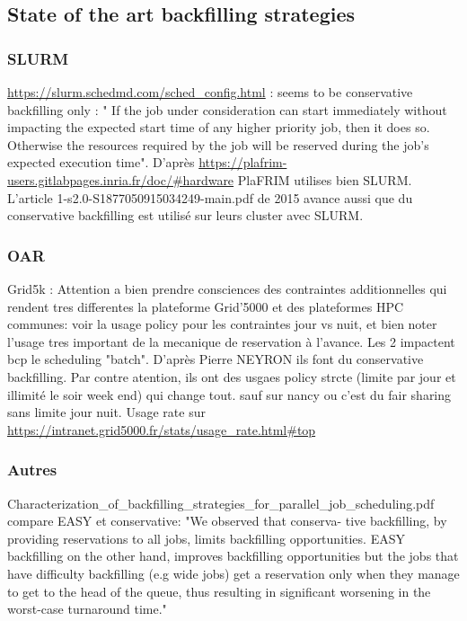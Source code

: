 \documentclass[a4paper]{article}
\begin{document}
\subsection{State of the art backfilling strategies}

\subsubsection{SLURM}

\url{https://slurm.schedmd.com/sched_config.html} : seems to be conservative backfilling only : " If the job under consideration can start immediately without impacting the expected start time of any higher priority job, then it does so. Otherwise the resources required by the job will be reserved during the job's expected execution time". D'après \url{https://plafrim-users.gitlabpages.inria.fr/doc/#hardware} PlaFRIM utilises bien SLURM.
L'article 1-s2.0-S1877050915034249-main.pdf de 2015 avance aussi que du conservative backfilling est utilisé sur leurs cluster avec SLURM.

\subsubsection{OAR}

Grid5k : Attention a bien prendre consciences des contraintes additionnelles qui rendent tres differentes la plateforme Grid'5000 et des plateformes HPC communes: voir la usage policy pour les contraintes jour vs nuit, et bien noter l'usage tres important de la mecanique de reservation à l'avance. Les 2 impactent bcp le scheduling "batch".
D'après Pierre NEYRON ils font du conservative backfilling. Par contre atention, ils ont des usgaes policy strcte (limite par jour et illimité le soir week end) qui change tout.
sauf sur nancy ou c'est du fair sharing sans limite jour nuit.
Usage rate sur \url{https://intranet.grid5000.fr/stats/usage_rate.html#top}

\subsubsection{Autres}

Characterization\_of\_backfilling\_strategies\_for\_parallel\_job\_scheduling.pdf compare EASY et conservative:
"We observed that conserva-
tive backfilling, by providing reservations to all jobs, limits
backfilling opportunities. EASY backfilling on the other
hand, improves backfilling opportunities but the jobs that
have difficulty backfilling (e.g wide jobs) get a reservation
only when they manage to get to the head of the queue,
thus resulting in significant worsening in the worst-case
turnaround time."
\end{document}
